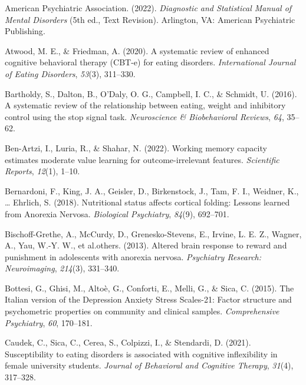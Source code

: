 \documentclass[
  man,floatsintext]{apa6}
\newlength{\cslhangindent}
\newlength{\cslentryspacingunit} %
\newenvironment{CSLReferences}[2] %
 {%
  \setlength{\parindent}{0pt}
  \ifodd #1
  \let\oldpar\par
  \def\par{\hangindent=\cslhangindent\oldpar}
  \fi
  \setlength{\parskip}{#2\cslentryspacingunit}
 }%
 {}
\begin{document}
\hypertarget{refs}{}
\begin{CSLReferences}{1}{0}
\leavevmode{}%
American Psychiatric Association. (2022). \emph{{Diagnostic and Statistical Manual of Mental Disorders}} (5th ed., Text Revision). Arlington, VA: {American Psychiatric Publishing}.

\leavevmode{}%
Atwood, M. E., \& Friedman, A. (2020). A systematic review of enhanced cognitive behavioral therapy (CBT-e) for eating disorders. \emph{International Journal of Eating Disorders}, \emph{53}(3), 311--330.

\leavevmode{}%
Bartholdy, S., Dalton, B., O'Daly, O. G., Campbell, I. C., \& Schmidt, U. (2016). A systematic review of the relationship between eating, weight and inhibitory control using the stop signal task. \emph{Neuroscience \& Biobehavioral Reviews}, \emph{64}, 35--62.

\leavevmode{}%
Ben-Artzi, I., Luria, R., \& Shahar, N. (2022). Working memory capacity estimates moderate value learning for outcome-irrelevant features. \emph{Scientific Reports}, \emph{12}(1), 1--10.

\leavevmode{}%
Bernardoni, F., King, J. A., Geisler, D., Birkenstock, J., Tam, F. I., Weidner, K., \ldots{} Ehrlich, S. (2018). Nutritional status affects cortical folding: {Lessons} learned from {Anorexia} {Nervosa}. \emph{Biological Psychiatry}, \emph{84}(9), 692--701.

\leavevmode{}%
Bischoff-Grethe, A., McCurdy, D., Grenesko-Stevens, E., Irvine, L. E. Z., Wagner, A., Yau, W.-Y. W., et al.others. (2013). Altered brain response to reward and punishment in adolescents with anorexia nervosa. \emph{Psychiatry Research: Neuroimaging}, \emph{214}(3), 331--340.

\leavevmode{}%
Bottesi, G., Ghisi, M., Altoè, G., Conforti, E., Melli, G., \& Sica, C. (2015). {The Italian version of the Depression Anxiety Stress Scales-21: Factor structure and psychometric properties on community and clinical samples}. \emph{Comprehensive Psychiatry}, \emph{60}, 170--181.

\leavevmode{}%
Caudek, C., Sica, C., Cerea, S., Colpizzi, I., \& Stendardi, D. (2021). Susceptibility to eating disorders is associated with cognitive inflexibility in female university students. \emph{Journal of Behavioral and Cognitive Therapy}, \emph{31}(4), 317--328.


\end{CSLReferences}
\end{document}
